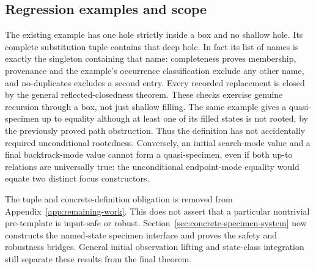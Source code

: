 \subsection{Regression examples and scope}
The existing example has one hole strictly inside a box and no shallow hole.
Its complete substitution tuple contains that deep hole. In fact its list of
names is exactly the singleton containing that name: completeness proves
membership, provenance and the example's occurrence classification exclude
any other name, and no-duplicates excludes a second entry. Every recorded
replacement is closed by the general reflected-closedness theorem. These
checks exercise genuine recursion through a box, not just shallow filling.
The same example gives a quasi-specimen up to equality although at least one
of its filled states is not rooted, by the previously proved path obstruction.
Thus the definition has not accidentally required unconditional rootedness.
Conversely, an initial search-mode value and a final backtrack-mode value
cannot form a quasi-specimen, even if both up-to relations are universally
true: the unconditional endpoint-mode equality would equate two distinct
focus constructors.

The tuple and concrete-definition obligation is removed from
Appendix~\ref{app:remaining-work}. This does not assert that a particular
nontrivial pre-template is input-safe or robust. Section~\ref{sec:concrete-specimen-system}
now constructs the named-state specimen interface and proves the safety and
robustness bridges. General initial observation lifting and state-class
integration still separate these results from the final theorem.
